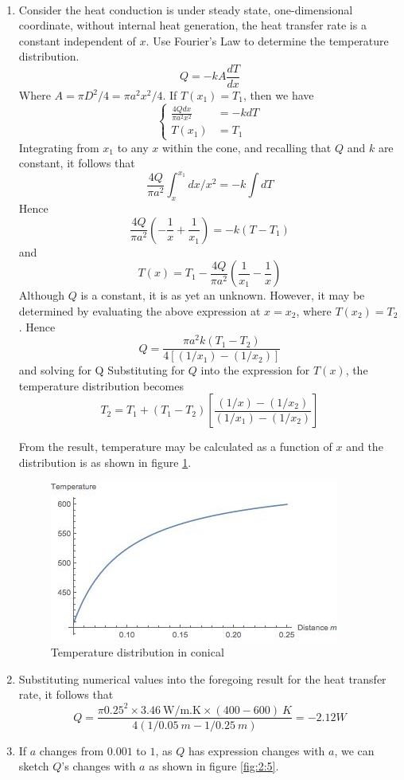 \begin{solution}
~\\
\begin{enumerate}
\item
Consider the heat conduction is under steady state, one-dimensional coordinate,
without internal heat generation, the heat transfer rate is a constant independent
of $x$. Use Fourier’s Law to determine the temperature distribution.
$$Q=-kA\frac{dT}{dx}$$
Where $A={\pi D^2}/{4}={\pi a^2x^2}/{4}$. If $T(x_1)=T_1$, then we have
\begin{equation*}
\left\{
\begin{aligned}
 \frac{4Qdx}{\pi a^2x^2}&=-kdT \\
 T(x_1)&=T_1
\end{aligned}
\right.
\end{equation*}
Integrating from $x_1$ to any $x$ within the cone, and recalling that $Q$ and $k$
are constant, it follows that
$$\frac{4Q}{\pi a^2}\int_x^{x_1} dx/x^2=-k\int dT$$
Hence
$$\frac{4Q}{\pi a^2}\left(-\frac{1}{x}+\frac{1}{x_1}\right)=-k\left(T-T_1\right)$$
and
$$T(x)=T_1-\frac{4Q}{\pi a^2}\left(\frac{1}{x_1}-\frac{1}{x}\right)$$
Although $Q$ is a constant, it is as yet an unknown.
However, it may be determined by evaluating the above expression at
$x=x_2$, where $T(x_2)=T_2$. Hence
$$Q=\frac{\pi a^2k(T_1-T_2)}{4[(1/x_1)-(1/x_2)]}$$
and solving for Q
Substituting for $Q$ into the expression for $T(x)$,
the temperature distribution becomes
$$T_2=T_1+(T_1-T_2)\left[\frac{(1/x)-(1/x_2)}{(1/x_1)-(1/x_2)}
\right]$$


From the result, temperature may be calculated as a function of $x$
and the distribution is as shown in figure \ref{fig:2:4}.
\begin{figure}[H]
  \centering
    \includegraphics[scale=1]{figures/ch2/4}
    \caption{Temperature distribution in conical}
    \label{fig:2:4}
\end{figure}
\item
Substituting numerical values into the foregoing result for the heat 
transfer rate, it follows that
$$Q=\frac{\pi 0.25^2\times3.46~\text{W/m.K}\times(400-600)~K}{4(1/0.05~m - 1/0.25~m)}=-2.12W$$
\item
If $a$ changes from $0.001$ to $1$, as $Q$ has expression changes with $a$,
we can sketch $Q$’s changes with $a$ as shown in figure \ref{fig:2:5}.


\end{enumerate}
\end{solution}
